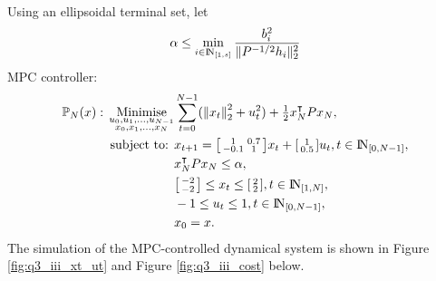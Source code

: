 \documentclass[a4paper,11pt,reqno]{amsart}
\newcommand{\N}{{\rm I\!N}}
\newcommand{\tran}{\intercal}
\begin{document}
\\
Using an ellipsoidal terminal set, let
\begin{equation}
    \alpha \leq \min_{i\in\N_{[1,s]}}\frac{b_i^2}{\|P^{-1/2}h_i\|_2^2}
\end{equation}
MPC controller:
\begin{subequations}
    \begin{align}
        \mathbb{P}_N(x){}:{}
        \operatorname*{Minimise}_{\substack{u_0,u_1,\ldots,u_{N-1}\\ x_0,x_1,\ldots,x_N}}&\sum_{t=0}^{N-1} (\left\lVert x_t\right\rVert ^2_2+u_t^2) + \tfrac{1}{2}x_N^{\tran}P x_N,
        \\
        \text{subject to: }& x_{t+1} = 
        \begin{bsmallmatrix}
            1&0.7\\
            -0.1&1
        \end{bsmallmatrix}x_t + 
        \begin{bsmallmatrix}
            1\\
            0.5
        \end{bsmallmatrix}u_t, t\in\N_{[0,N-1]},
        \\
        &x_N^{\tran} P x_N \leq \alpha,
        \\
        &\begin{bsmallmatrix}
            -2\\
            -2
        \end{bsmallmatrix} 
        \leq x_t \leq 
        \begin{bsmallmatrix}
            2\\
            2
        \end{bsmallmatrix}, t\in\N_{[1,N]},
        \\
        &-1 \leq u_t \leq 1, t\in\N_{[0,N-1]},
        \\
        & x_0 = x.
    \end{align}
\end{subequations}
The simulation of the MPC-controlled dynamical system is shown in Figure \ref{fig:q3_iii_xt_ut} and Figure \ref{fig:q3_iii_cost} below.
\end{document}
